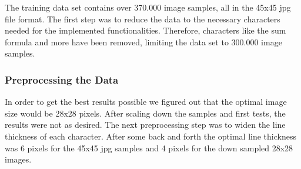 \documentclass[@CLASSOPTIONS@]{tumarticle}
\begin{document}
The training data set contains over 370.000 image samples, all in the 45x45 jpg file format.
The first step was to reduce the data to the necessary characters needed for the
implemented functionalities.
Therefore, characters like the sum formula and more have been removed, limiting the data set
to 300.000 image samples.

\subsubsection{Preprocessing the Data}

In order to get the best results possible we figured out that the optimal image size would be
28x28 pixels.
After scaling down the samples and first tests, the results were not as desired.
The next preprocessing step was to widen the line thickness of each character.
After some back and forth the optimal line thickness was 6 pixels for the 45x45 jpg samples and
4 pixels for the down sampled 28x28 images.
\end{document}

